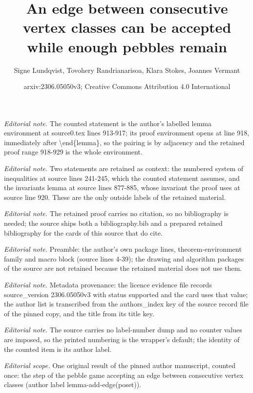 \documentclass[10pt,a4paper]{article}
\title{An edge between consecutive vertex classes can be accepted while enough pebbles remain}
\author{Signe Lundqvist, Tovohery Randrianarisoa, Klara Stokes, Joannes Vermant}
\date{arxiv:2306.05050v3; Creative Commons Attribution 4.0 International}
\newtheorem{rem
ark}[theorem]{Remark}
\begin{document}
\maketitle
\noindent\textit{Editorial note.} The counted statement is the author's labelled lemma environment at source0.tex lines 913-917; its proof environment opens at line 918, immediately after \textbackslash{}end\{lemma\}, so the pairing is by adjacency and the retained proof range 918-929 is the whole environment.\par\medskip
\noindent\textit{Editorial note.} Two statements are retained as context: the numbered system of inequalities at source lines 241-245, which the counted statement assumes, and the invariants lemma at source lines 877-885, whose invariant the proof uses at source line 920. These are the only outside labels of the retained material.\par\medskip
\noindent\textit{Editorial note.} The retained proof carries no citation, so no bibliography is needed; the source ships both a bibliography.bib and a prepared retained bibliography for the cards of this source that do cite.\par\medskip
\noindent\textit{Editorial note.} Preamble: the author's own package lines, theorem-environment family and macro block (source lines 4-39); the drawing and algorithm packages of the source are not retained because the retained material does not use them.\par\medskip
\noindent\textit{Editorial note.} Metadata provenance: the licence evidence file records source\_version 2306.05050v3 with status supported and the card uses that value; the author list is transcribed from the authors\_index key of the source record file of the pinned copy, and the title from its title key.\par\medskip
\noindent\textit{Editorial note.} The source carries no label-number dump and no counter values are imposed, so the printed numbering is the wrapper's default; the identity of the counted item is its author label.\par\medskip
\noindent\textit{Editorial scope.} One original result of the pinned author manuscript, counted once: the step of the pebble game accepting an edge between consecutive vertex classes (author label lemma-add-edge(poset)).\par\medskip
\end{document}
